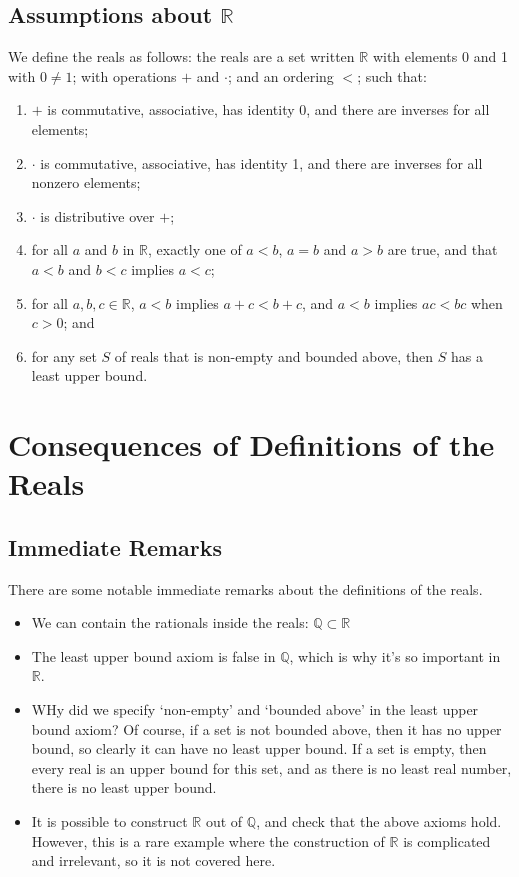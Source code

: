 \documentclass{article}
\begin{document}
\subsection{Assumptions about $\mathbb R$}
We define the reals as follows: the reals are a set written $\mathbb R$ with elements 0 and 1 with $0 \neq 1$; with operations $+$ and $\cdot$; and an ordering $<$; such that:
\begin{enumerate}
	\item $+$ is commutative, associative, has identity 0, and there are inverses for all elements;
	\item $\cdot$ is commutative, associative, has identity 1, and there are inverses for all nonzero elements;
	\item $\cdot$ is distributive over $+$;
	\item for all $a$ and $b$ in $\mathbb R$, exactly one of $a<b$, $a=b$ and $a>b$ are true, and that $a<b$ and $b<c$ implies $a<c$;
	\item for all $a, b, c \in \mathbb R$, $a<b$ implies $a + c < b + c$, and $a<b$ implies $ac < bc$ when $c > 0$; and
	\item for any set $S$ of reals that is non-empty and bounded above, then $S$ has a least upper bound.
\end{enumerate}

\section{Consequences of Definitions of the Reals}
\subsection{Immediate Remarks}
There are some notable immediate remarks about the definitions of the reals.
\begin{itemize}
	\item We can contain the rationals inside the reals: $\mathbb Q \subset \mathbb R$
	\item The least upper bound axiom is false in $\mathbb Q$, which is why it's so important in $\mathbb R$.
	\item WHy did we specify `non-empty' and `bounded above' in the least upper bound axiom? Of course, if a set is not bounded above, then it has no upper bound, so clearly it can have no least upper bound. If a set is empty, then every real is an upper bound for this set, and as there is no least real number, there is no least upper bound.
	\item It is possible to construct $\mathbb R$ out of $\mathbb Q$, and check that the above axioms hold. However, this is a rare example where the construction of $\mathbb R$ is complicated and irrelevant, so it is not covered here.
\end{itemize}
\end{document}
